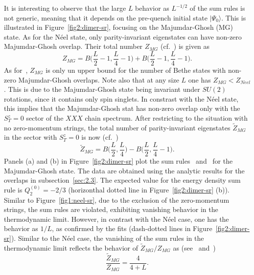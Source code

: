 \documentclass[11pt]{iopart}
\begin{document}
It is interesting to observe that the large $L$ behavior as $L^{-1/2}$  of the sum 
rules is not generic, meaning that it depends on the pre-quench initial state $|\Psi_0
\rangle$. This is illustrated in Figure~\ref{fig2:dimer-sr}, focusing on the 
Majumdar-Ghosh (MG) state. As for the N\'eel state, only parity-invariant eigenstates 
can have non-zero Majumdar-Ghosh overlap. Their total number $Z_{MG}$ (cf.~) 
is given as 
%
\begin{equation}
\label{mg1}
Z_{MG}=B\Big(\frac{L}{2}-1,\frac{L}{4}-1\Big)+B\Big(\frac{L}{2}-1,
\frac{L}{4}-1\Big). 
\end{equation}
%
As for~, $Z_{MG}$ is only un upper bound for the number of Bethe states with 
non-zero Majumdar-Ghosh overlaps. Note also that at any size $L$ one has $Z_{MG}<Z_{Neel}$. 
This is due to the Majumdar-Ghosh state being invariant under $SU(2)$ rotations, since it 
contains only spin singlets. In constrast with the N\'eel state, this implies that the 
Majumdar-Ghosh stat has non-zero overlap only with the $S^z_T=0$ sector of the $XXX$ chain 
spectrum. After restricting to the situation with no zero-momentum strings, the total number 
of parity-invariant eigenstates $\widetilde Z_{MG}$ in the sector with $S_T^z=0$ is now 
(cf.~)
%
\begin{equation}
\label{mg2}
\widetilde Z_{MG}=B\Big(\frac{L}{2},\frac{L}{4}\Big)-B\Big(\frac{L}{2},
\frac{L}{4}-1\Big). 
\end{equation}
%
Panels (a) and (b) in Figure~\ref{fig2:dimer-sr} plot the sum rules~ 
and~ for the Majumdar-Ghosh state. The data are obtained using the 
analytic results for the overlaps in subsection~\ref{sec:2.3}. The expected value for 
the energy density sum rule is $Q_2^{(0)}=-2/3$ (horizonthal dotted line in 
Figure~\ref{fig2:dimer-sr} (b)). Similar to Figure~\ref{fig1:neel-sr}, due to the exclusion 
of the zero-momentum strings, the sum rules are violated, exhibiting vanishing behavior in 
the thermodynamic limit. However, in contrast with the N\'eel case, one has the behavior 
as $1/L$, as confirmed by the fits (dash-dotted lines in Figure~\ref{fig2:dimer-sr}). 
Similar to the N\'eel case, the vanishing of the sum rules in the thermodynamic limit 
reflects the behavior of $\widetilde Z_{MG}/Z_{MG}$ as (see~ and~)
%
\begin{equation}
\frac{\widetilde Z_{MG}}{Z_{MG}}=\frac{4}{4+L}. 
\end{equation}
%
\end{document}
